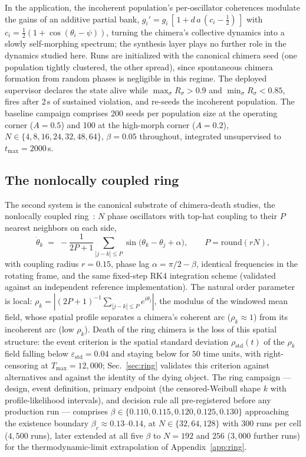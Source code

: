\documentclass[pdflatex,sn-mathphys,Numbered]{sn-jnl}
\begin{document}
In the application, the incoherent population's per-oscillator coherences modulate
the gains of an additive partial bank, $g_i' = g_i\,[\,1 + d\,a\,(c_i - \tfrac12)\,]$
with $c_i = \tfrac12(1 + \cos(\theta_i - \psi))$, turning the chimera's collective
dynamics into a slowly self-morphing spectrum; the synthesis layer plays no further
role in the dynamics studied here. Runs are initialized with the canonical chimera
seed (one population tightly clustered, the other spread), since spontaneous chimera
formation from random phases is negligible in this regime. The deployed supervisor
declares the state alive while $\max_\sigma R_\sigma > 0.9$ and
$\min_\sigma R_\sigma < 0.85$, fires after 2\,s of sustained violation, and re-seeds
the incoherent population. The baseline campaign comprises 200 seeds per population
size at the operating corner ($A = 0.5$) and 100 at the high-morph corner
($A = 0.2$), $N \in \{4, 8, 16, 24, 32, 48, 64\}$, $\beta = 0.05$ throughout,
integrated unsupervised to $t_{\max} = 2000$\,s.

\subsection{The nonlocally coupled ring}\label{sec:system:ring}

The second system is the canonical substrate of chimera-death studies, the
nonlocally coupled ring~\cite{kb2002,wo2011}: $N$ phase oscillators with top-hat
coupling to their $P$ nearest neighbors on each side,
\begin{equation}
\dot\theta_k \;=\; -\frac{1}{2P+1} \sum_{|j-k|\le P}
\sin\!\big(\theta_k - \theta_j + \alpha\big),
\qquad P = \mathrm{round}(rN),
\label{eq:ring}
\end{equation}
with coupling radius $r = 0.15$, phase lag $\alpha = \pi/2 - \beta$, identical
frequencies in the rotating frame, and the same fixed-step RK4 integration scheme
(validated against an independent reference implementation). The natural order
parameter is local: $\rho_k = |(2P+1)^{-1} \sum_{|j-k| \le P} e^{i\theta_j}|$, the
modulus of the windowed mean field, whose spatial profile separates a chimera's
coherent arc ($\rho_k \approx 1$) from its incoherent arc (low $\rho_k$). Death of
the ring chimera is the loss of this spatial structure: the event criterion is the
spatial standard deviation $\rho_{\mathrm{std}}(t)$ of the $\rho_k$ field falling
below $\varepsilon_{\mathrm{std}} = 0.04$ and staying below for $50$ time units,
with right-censoring at $T_{\max} = 12{,}000$; Sec.~\ref{sec:ring} validates this
criterion against alternatives and against the identity of the dying object. The
ring campaign --- design, event definition, primary endpoint (the censored-Weibull
shape $k$ with profile-likelihood intervals), and decision rule all pre-registered
before any production run --- comprises
$\beta \in \{0.110, 0.115, 0.120, 0.125, 0.130\}$ approaching the existence
boundary $\beta_c \approx 0.13$--$0.14$, at $N \in \{32, 64, 128\}$ with $300$ runs
per cell ($4{,}500$ runs), later extended at all five $\beta$ to $N = 192$ and
$256$ ($3{,}000$ further runs) for the thermodynamic-limit extrapolation of
Appendix~\ref{app:ring}.
\end{document}
